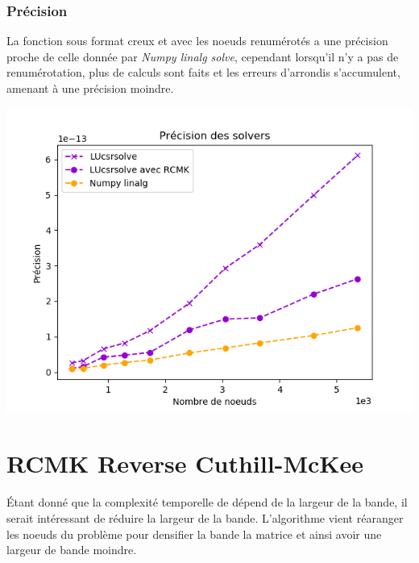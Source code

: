 \documentclass{article}[11pt]
\begin{document}
\subsubsection{Précision}
\begin{minipage}{0.40\textwidth}
    La fonction sous format creux et avec les noeuds renumérotés a une précision proche de celle donnée par \textit{Numpy linalg solve}, cependant lorsqu'il n'y a pas de renumérotation, plus de calculs sont faits et les erreurs d'arrondis s'accumulent, amenant à une précision moindre.
\end{minipage}
\begin{minipage}{0.60\textwidth}
    \includegraphics[width=\textwidth]{res/plots/accuracy.png}
\end{minipage}
\section{RCMK \lbrack Reverse Cuthill-McKee\rbrack}

Étant donné que la complexité temporelle de  dépend de la largeur de la bande, il serait intéressant de réduire la largeur de la bande. L'algorithme  vient réaranger les noeuds du problème pour densifier la bande la matrice et ainsi avoir une largeur de bande moindre.

\label{sec:RCMK}
\end{document}
